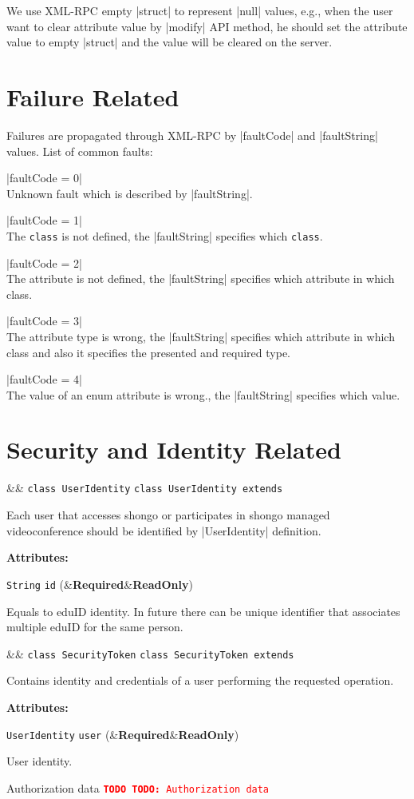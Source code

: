\documentclass[a4paper]{report}
\newenvironment{Api}{\begin{itemize}}{\end{itemize}}
\newcommand{\ApiCode}[1]{\lstinline[style=styleApi]|#1|}
\newcommand{\ApiValue}[1]{\verb|#1|}
\newcommand{\ApiItem}[1]{\item #1 %

}
\newcommand{\ApiClass}[2]{\ApiItem{%
  \ifx&#2& \ApiCode{class #1} \else \ApiCode{class #1 extends #2} \fi}%
}
\newenvironment{ApiClassAttributes}{%

\begin{samepage}\textbf{Attributes:}\begin{compactitem}}{\end{compactitem}\end{samepage}}
\newcommand{\ApiRequired}{{\color{blue!50!black}\textbf{Required}}}
\newcommand{\ApiReadOnly}{{\color{red!50!black}\textbf{ReadOnly}}}
\newcommand{\ApiClassAttribute}[3]{\ApiItem{\ApiCode{#2} \ApiCode{#1} \hspace{1mm}(\ifx&#3&\ApiReadOnly\else#3\fi)
}}
\newcommand{\TODO}[1]{%
\def\empty{}%
\def\prvniparametr{#1}%
\ifx\prvniparametr\empty%
\begingroup\tt\textcolor{red}{\noindent\textbf{TODO}}\endgroup
\else%
\begingroup\tt\textcolor{red}{\noindent\textbf{TODO:}\ #1}\endgroup
\fi%
}
\begin{document}
We use XML-RPC empty |struct| to represent |null| values, e.g., when the user want to clear attribute value by |modify| API method, he should set the attribute value to empty |struct| and the value will be cleared on the server.


\section{Failure Related}

Failures are propagated through XML-RPC by |faultCode| and |faultString| values. List of common faults:
\begin{compactitem}
\item |faultCode = 0| \\ Unknown fault which is described by |faultString|.
\item |faultCode = 1| \\ The \ApiValue{class} is not defined, the |faultString| specifies which \ApiValue{class}.
\item |faultCode = 2| \\ The attribute is not defined, the |faultString| specifies which attribute in which class.
\item |faultCode = 3| \\ The attribute type is wrong, the |faultString| specifies which attribute in which class and also it specifies the presented and required type.
\item |faultCode = 4| \\ The value of an enum attribute is wrong., the |faultString| specifies which value.
\end{compactitem}


\section{Security and Identity Related}

\begin{Api}

\ApiClass{UserIdentity}{}
Each user that accesses shongo or participates in shongo managed videoconference should be identified by |UserIdentity| definition.
\begin{ApiClassAttributes}
\ApiClassAttribute{id}{String}{\ApiRequired}
Equals to eduID identity. In future there can be unique identifier that associates multiple eduID for the same person.
\end{ApiClassAttributes}


\ApiClass{SecurityToken}{}
Contains identity and credentials of a user performing the requested operation.
\begin{ApiClassAttributes}
\ApiClassAttribute{user}{UserIdentity}{\ApiRequired}
User identity.
\item \TODO{Authorization data}
\end{ApiClassAttributes}

\end{Api}
\end{document}
